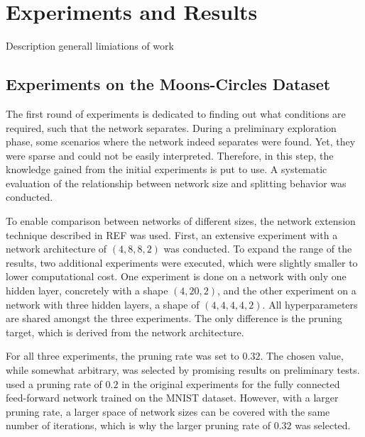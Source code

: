 \chapter{Experiments and Results}
Description generall
limiations of work

\section{Experiments on the Moons-Circles Dataset}
The first round of experiments is dedicated to finding out what conditions are required, such that the network separates.
During a preliminary exploration phase, some scenarios where the network indeed separates were found.
Yet, they were sparse and could not be easily interpreted.
Therefore, in this step, the knowledge gained from the initial experiments is put to use.
A systematic evaluation of the relationship between network size and splitting behavior was conducted.

To enable comparison between networks of different sizes, the network extension technique described in REF was used.
First, an extensive experiment with a network architecture of $(4,8,8,2)$ was conducted.
To expand the range of the results, two additional experiments were executed, which were slightly smaller to lower computational cost.
One experiment is done on a network with only one hidden layer, concretely with a shape $(4,20,2)$, and the other experiment on a network with three hidden layers, a shape of $(4,4,4,4,2)$.
All hyperparameters are shared amongst the three experiments.
The only difference is the pruning target, which is derived from the network architecture.

For all three experiments, the pruning rate was set to $0.32$.
The chosen value, while somewhat arbitrary, was selected by promising results on preliminary tests.
\textcite{LTH} used a pruning rate of $0.2$ in the original experiments for the fully connected feed-forward network trained on the MNIST dataset.
However, with a larger pruning rate, a larger space of network sizes can be covered with the same number of iterations, which is why the larger pruning rate of $0.32$ was selected.


